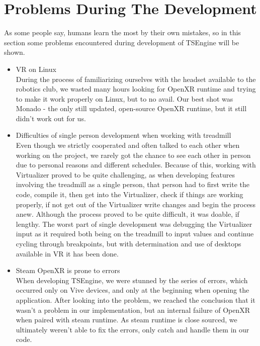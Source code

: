 \newpage
\section{Problems During The Development}
\label{sec:problems}
\hspace{\parindent}
As some people say, humans learn the most by their own mistakes, so in this section some problems encountered during development of TSEngine will be shown.
\begin{itemize}
    \item {VR on Linux}\\
    During the process of familiarizing ourselves with the headset available to the robotics club, we wasted many hours looking for OpenXR runtime and trying to make it work properly on Linux, but to no avail. Our best shot was Monado - the only still updated, open-source OpenXR runtime, but it still didn't work out for us. 
    
    \item {Difficulties of single person development when working with treadmill}\\
    Even though we strictly cooperated and often talked to each other when working on the project, we rarely got the chance to see each other in person due to personal reasons and different schedules. Because of this, working with Virtualizer proved to be quite challenging, as when developing features involving the treadmill as a single person, that person had to first write the code, compile it, then get into the Virtualizer, check if things are working properly, if not get out of the Virtualizer write changes and begin the process anew. Although the process proved to be quite difficult, it was doable, if lengthy. The worst part of single development was debugging the Virtualizer input as it required both being on the treadmill to input values and continue cycling through breakpoints, but with determination and use of desktops available in VR it has been done.
    
    \item {Steam OpenXR is prone to errors}\\
    When developing TSEngine, we were stunned by the series of errors, which occurred only on Vive devices, and only at the beginning when opening the application. After looking into the problem, we reached the conclusion that it wasn't a problem in our implementation, but an internal failure of OpenXR when paired with steam runtime. As steam runtime is close sourced, we ultimately weren't able to fix the errors, only catch and handle them in our code. 
    

\end{itemize}
